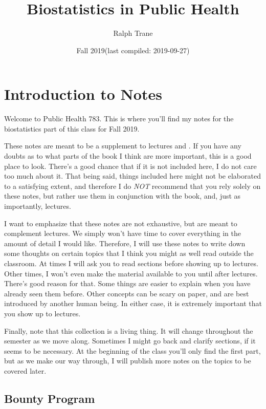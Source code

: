 \documentclass[]{book}
\title{Biostatistics in Public Health}
\author{Ralph Trane}
\date{Fall 2019(last compiled: 2019-09-27)}
\theoremstyle{definition}
\theoremstyle{definition}
\theoremstyle{definition}
\theoremstyle{remark}
\begin{document}
\maketitle

{
\setcounter{tocdepth}{1}
\tableofcontents
}
\hypertarget{introduction-to-notes}{%
\chapter{Introduction to Notes}\label{introduction-to-notes}}

\newcommand{\Var}{\text{Var}}
\newcommand{\var}{\text{var}}
\newcommand{\SD}{\text{SD}}

Welcome to Public Health 783. This is where you'll find my notes for the biostatistics part of this class for Fall 2019.

These notes are meant to be a supplement to lectures and \citet{ls}. If you have any doubts as to what parts of the book I think are more important, this is a good place to look. There's a good chance that if it is not included here, I do not care too much about it. That being said, things included here might not be elaborated to a satisfying extent, and therefore I do \emph{NOT} recommend that you rely solely on these notes, but rather use them in conjunction with the book, and, just as importantly, lectures.

I want to emphasize that these notes are not exhaustive, but are meant to complement lectures. We simply won't have time to cover everything in the amount of detail I would like. Therefore, I will use these notes to write down some thoughts on certain topics that I think you might as well read outside the classroom. At times I will ask you to read sections before showing up to lectures. Other times, I won't even make the material available to you until after lectures. There's good reason for that. Some things are easier to explain when you have already seen them before. Other concepts can be scary on paper, and are best introduced by another human being. In either case, it is extremely important that you show up to lectures.

Finally, note that this collection is a living thing. It will change throughout the semester as we move along. Sometimes I might go back and clarify sections, if it seems to be necessary. At the beginning of the class you'll only find the first part, but as we make our way through, I will publish more notes on the topics to be covered later.

\hypertarget{bounty-program}{%
\section*{Bounty Program}\label{bounty-program}}
\end{document}
